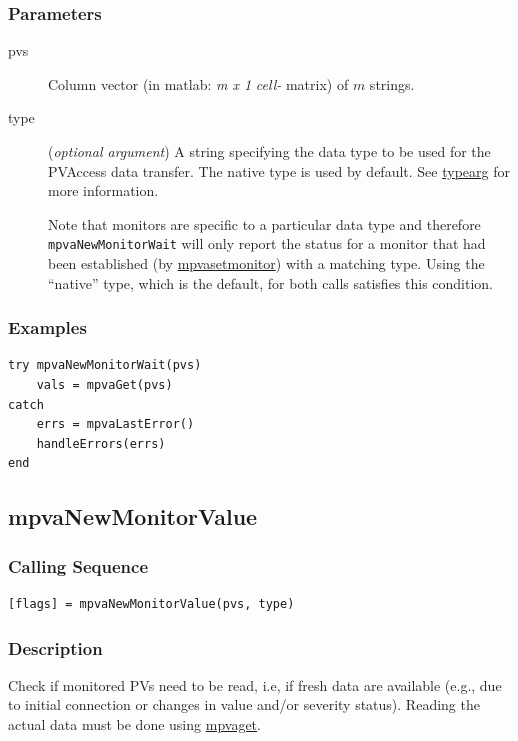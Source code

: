 \documentclass{article}
\newcommand{\com}[1]{{\tt #1}}
\newcommand{\pbrk}{\pagebreak[3]}
\newcommand{\comref}[2]{\hyperref{\com{#1}}{\com{#1} (see }{)}{#2}}
\newcommand{\ita}[1]{\emph{#1}}
\newcommand{\m}{$m$}
\newcommand{\mhack}{$m$} %
\newcommand{\mxl}{$m\times 1$}
\renewcommand{\m}{\ita{m}}
\newcommand{\mhack}{\ita{m}} %
\renewcommand{\mxl}{\ita{m x 1}}
\renewcommand{\pbrk}{}
\newcommand{\PVITEM}{
\item[pvs] Column vector (in matlab: \mxl{} \ita{cell-} matrix)
of \mhack{} strings.
}
\begin{document}
\subsubsection{Parameters}
\begin{description}
\PVITEM
\item[type]
(\ita{optional argument}) A string specifying the
data type to be used for the PVAccess data transfer. The
native type is used by default.
See \hyperref{here}{(}{)}{typearg} for more information.

Note that monitors are specific to a particular data type and therefore
\com{mpvaNewMonitorWait} will only report the status for a monitor that had been established
(by \comref{mpvaSetMonitor}{mpvasetmonitor}) with a matching type.
Using the ``native'' type, which is the default, for both calls
satisfies this condition.
\end{description}
\subsubsection{Examples}
\begin{verbatim}
try mpvaNewMonitorWait(pvs)
	vals = mpvaGet(pvs)
catch
	errs = mpvaLastError()
	handleErrors(errs)
end
\end{verbatim}

\pbrk
\subsection{mpvaNewMonitorValue}
\label{mpvanewmonitorvalue}
\subsubsection{Calling Sequence}
\begin{verbatim}
[flags] = mpvaNewMonitorValue(pvs, type)
\end{verbatim}
\subsubsection{Description}
Check if monitored PVs need to be read, i.e, if fresh data are available (e.g., due to
initial connection or changes in value and/or severity status). Reading the actual
data must be done using \comref{mpvaGet}{mpvaget}.
\end{document}
